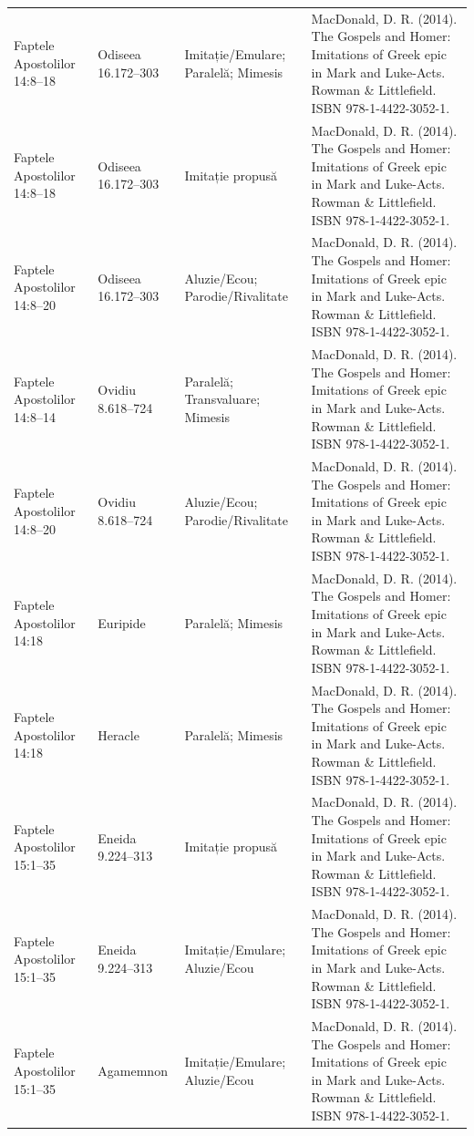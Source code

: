 \documentclass[12pt,a4paper,twoside,openany]{book}
\begin{document}
\begin{longtable}{L{1.4cm}L{1.7cm}L{3.1cm}L{8.4cm}}
Faptele Apostolilor 14:8–18 & Odiseea 16.172–303 & Imitație/Emulare; Paralelă; Mimesis & MacDonald, D. R. (2014). The Gospels and Homer: Imitations of Greek epic in Mark and Luke-Acts. Rowman \& Littlefield. ISBN 978-1-4422-3052-1. \\
Faptele Apostolilor 14:8–18 & Odiseea 16.172–303 & Imitație propusă & MacDonald, D. R. (2014). The Gospels and Homer: Imitations of Greek epic in Mark and Luke-Acts. Rowman \& Littlefield. ISBN 978-1-4422-3052-1. \\
Faptele Apostolilor 14:8–20 & Odiseea 16.172–303 & Aluzie/Ecou; Parodie/Rivalitate & MacDonald, D. R. (2014). The Gospels and Homer: Imitations of Greek epic in Mark and Luke-Acts. Rowman \& Littlefield. ISBN 978-1-4422-3052-1. \\
Faptele Apostolilor 14:8–14 & Ovidiu 8.618–724 & Paralelă; Transvaluare; Mimesis & MacDonald, D. R. (2014). The Gospels and Homer: Imitations of Greek epic in Mark and Luke-Acts. Rowman \& Littlefield. ISBN 978-1-4422-3052-1. \\
Faptele Apostolilor 14:8–20 & Ovidiu 8.618–724 & Aluzie/Ecou; Parodie/Rivalitate & MacDonald, D. R. (2014). The Gospels and Homer: Imitations of Greek epic in Mark and Luke-Acts. Rowman \& Littlefield. ISBN 978-1-4422-3052-1. \\
Faptele Apostolilor 14:18 & Euripide & Paralelă; Mimesis & MacDonald, D. R. (2014). The Gospels and Homer: Imitations of Greek epic in Mark and Luke-Acts. Rowman \& Littlefield. ISBN 978-1-4422-3052-1. \\
Faptele Apostolilor 14:18 & Heracle & Paralelă; Mimesis & MacDonald, D. R. (2014). The Gospels and Homer: Imitations of Greek epic in Mark and Luke-Acts. Rowman \& Littlefield. ISBN 978-1-4422-3052-1. \\
Faptele Apostolilor 15:1–35 & Eneida 9.224–313 & Imitație propusă & MacDonald, D. R. (2014). The Gospels and Homer: Imitations of Greek epic in Mark and Luke-Acts. Rowman \& Littlefield. ISBN 978-1-4422-3052-1. \\
Faptele Apostolilor 15:1–35 & Eneida 9.224–313 & Imitație/Emulare; Aluzie/Ecou & MacDonald, D. R. (2014). The Gospels and Homer: Imitations of Greek epic in Mark and Luke-Acts. Rowman \& Littlefield. ISBN 978-1-4422-3052-1. \\
Faptele Apostolilor 15:1–35 & Agamemnon & Imitație/Emulare; Aluzie/Ecou & MacDonald, D. R. (2014). The Gospels and Homer: Imitations of Greek epic in Mark and Luke-Acts. Rowman \& Littlefield. ISBN 978-1-4422-3052-1. \\

\end{longtable}
\end{document}
